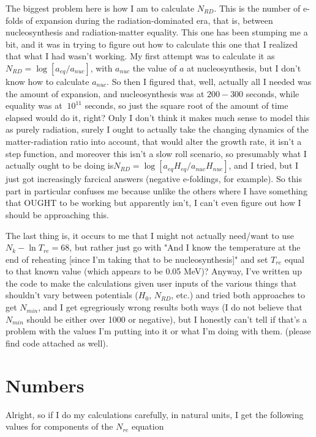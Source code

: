 \documentclass[preprint,aps]{revtex4}
\begin{document}
The biggest problem here is how I am to calculate $N_{RD}$. This is the number of e-folds of expansion during the radiation-dominated era, that is, between nucleosynthesis and radiation-matter equality. This one has been stumping me a bit, and it was in trying to figure out how to calculate this one that I realized that what I had wasn't working. My first attempt was to calculate it as $N_{RD}=\log[a_{eq}/a_{nuc}]$, with $a_{nuc}$ the value of $a$ at nucleosynthesis, but I don't know how to calculate $a_{nuc}$. So then I figured that, well, actually all I needed was the amount of expansion, and nucleosynthesis was at $200-300$ seconds, while equality was at $~10^{11}$ seconds, so just the square root of the amount of time elapsed would do it, right? Only I don't think it makes much sense to model this as purely radiation, surely I ought to actually take the changing dynamics of the matter-radiation ratio into account, that would alter the growth rate, it isn't a step function, and moreover this isn't a slow roll scenario, so presumably what I actually ought to be doing is$N_{RD}=\log[a_{eq}H_{eq}/a_{nuc}H_{nuc}]$, and I tried, but I just got increasingly farcical answers (negative e-foldings, for example). So this part in particular confuses me because unlike the others where I have something that OUGHT to be working but apparently isn't, I can't even figure out how I should be approaching this. 

The last thing is, it occurs to me that I might not actually need/want to use $N_k-\ln{T_{re}} = 68$, but rather just go with "And I know the temperature at the end of reheating [since I'm taking that to be nucleosynthesis]" and set $T_{re}$ equal to that known value (which appears to be 0.05 MeV)?
Anyway, I've written up the code to make the calculations given user inputs of the various things that shouldn't vary between potentials ($H_0$, $N_{RD}$, etc.) and tried both approaches to get $N_{min}$, and I get egregriously wrong results both ways (I do not believe that $N_{min}$ should be either over 1000 or negative), but I honestly can't tell if that's a problem with the values I'm putting into it or what I'm doing with them. (please find code attached as well).  


\section{Numbers}
Alright, so if I do my calculations carefully, in natural units, I get the following values for components of the $N_{re}$ equation
\end{document}
